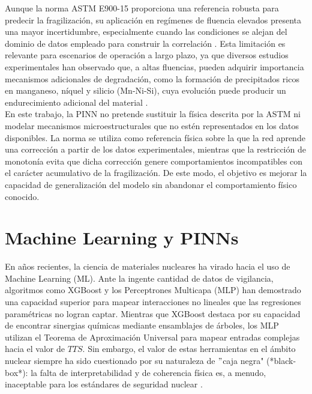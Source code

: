 \documentclass[a4paper, 12pt, twocolumn]{book}
\begin{document}
Aunque la norma ASTM E900-15 proporciona una referencia robusta para predecir la fragilización, su aplicación en regímenes de fluencia elevados presenta una mayor incertidumbre, especialmente cuando las condiciones se alejan del dominio de datos empleado para construir la correlación \cite{astmE90015}. Esta limitación es relevante para escenarios de operación a largo plazo, ya que diversos estudios experimentales han observado que, a altas fluencias, pueden adquirir importancia mecanismos adicionales de degradación, como la formación de precipitados ricos en manganeso, níquel y silicio (Mn-Ni-Si), cuya evolución puede producir un endurecimiento adicional del material \cite{wells2014mnsi,ke2017mnsi}.\\

En este trabajo, la PINN no pretende sustituir la física descrita por la ASTM ni modelar mecanismos microestructurales que no estén representados en los datos disponibles. La norma se utiliza como referencia física sobre la que la red aprende una corrección a partir de los datos experimentales, mientras que la restricción de monotonía evita que dicha corrección genere comportamientos incompatibles con el carácter acumulativo de la fragilización. De este modo, el objetivo es mejorar la capacidad de generalización del modelo sin abandonar el comportamiento físico conocido.

\section{Machine Learning y PINNs}

En años recientes, la ciencia de materiales nucleares ha virado hacia el uso de Machine Learning (ML). Ante la ingente cantidad de datos de vigilancia, algoritmos como XGBoost y los Perceptrones Multicapa (MLP) han demostrado una capacidad superior para mapear interacciones no lineales que las regresiones paramétricas no logran captar. Mientras que XGBoost destaca por su capacidad de encontrar sinergias químicas mediante ensamblajes de árboles, los MLP utilizan el Teorema de Aproximación Universal para mapear entradas complejas hacia el valor de $TTS$. Sin embargo, el valor de estas herramientas en el ámbito nuclear siempre ha sido cuestionado por su naturaleza de $"$caja negra" (*black-box*): la falta de interpretabilidad y de coherencia física es, a menudo, inaceptable para los estándares de seguridad nuclear \parencite{ma2020}.\\
\end{document}

